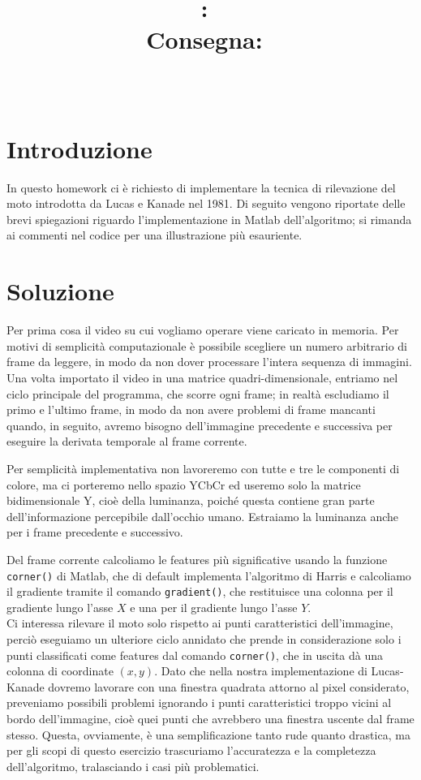 \documentclass{article}
\title{
\vspace{2in}
\textmd{\textbf{\hmwkClass:\ \hmwkTitle}}\\
\normalsize\vspace{0.1in}\small{Consegna:\ \hmwkDueDate}\\
\vspace{0.1in}\large{\textit{\hmwkClassInstructor\ \hmwkClassTime}}
\vspace{3in}
}
\author{\textbf{\hmwkAuthorName}}
\begin{document}
\maketitle

\newpage

\section*{Introduzione}
In questo homework ci è richiesto di implementare la tecnica di rilevazione del moto introdotta da Lucas e Kanade nel 1981. Di seguito vengono riportate delle brevi spiegazioni riguardo l'implementazione in Matlab dell'algoritmo; si rimanda ai commenti nel codice per una illustrazione più esauriente.

\section*{Soluzione}
Per prima cosa il video su cui vogliamo operare viene caricato in memoria. Per motivi di semplicità computazionale è possibile scegliere un numero arbitrario di frame da leggere, in modo da non dover processare l'intera sequenza di immagini. Una volta importato il video in una matrice quadri-dimensionale, entriamo nel ciclo principale del programma, che scorre ogni frame; in realtà escludiamo il primo e l'ultimo frame, in modo da non avere problemi di frame mancanti quando, in seguito, avremo bisogno dell'immagine precedente e successiva per eseguire la derivata temporale al frame corrente.

Per semplicità implementativa non lavoreremo con tutte e tre le componenti di colore, ma ci porteremo nello spazio YCbCr ed useremo solo la matrice bidimensionale Y, cioè della luminanza, poiché questa contiene gran parte dell'informazione percepibile dall'occhio umano. Estraiamo la luminanza anche per i frame precedente e successivo. 

Del frame corrente calcoliamo le features più significative usando la funzione \texttt{corner()} di Matlab, che di default implementa l'algoritmo di Harris e calcoliamo il gradiente tramite il comando \texttt{gradient()}, che restituisce una colonna per il gradiente lungo l'asse $X$ e una per il gradiente lungo l'asse $Y$.\\

Ci interessa rilevare il moto solo rispetto ai punti caratteristici dell'immagine, perciò eseguiamo un ulteriore ciclo annidato che prende in considerazione solo i punti classificati come features dal comando \texttt{corner()}, che in uscita dà una colonna di coordinate $(x,y)$. Dato che nella nostra implementazione di Lucas-Kanade dovremo lavorare con una finestra quadrata attorno al pixel considerato, preveniamo possibili problemi ignorando i punti caratteristici troppo vicini al bordo dell'immagine, cioè quei punti che avrebbero una finestra uscente dal frame stesso. Questa, ovviamente, è una semplificazione tanto rude quanto drastica, ma per gli scopi di questo esercizio trascuriamo l'accuratezza e la completezza dell'algoritmo, tralasciando i casi più problematici.
\end{document}
